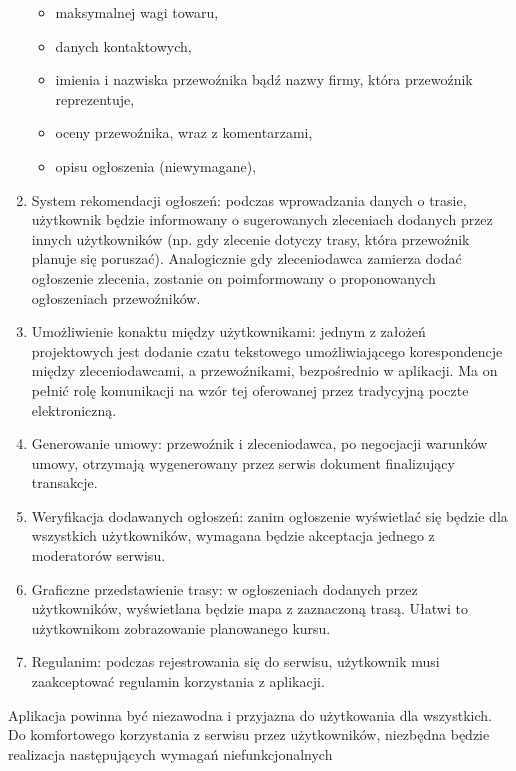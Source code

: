 \begin{enumerate}
\begin{itemize}
        \item maksymalnej wagi towaru,
        \item danych kontaktowych,
        \item imienia i nazwiska przewoźnika bądź nazwy firmy, która przewoźnik reprezentuje,
        \item oceny przewoźnika, wraz z komentarzami,
        \item opisu ogłoszenia (niewymagane),
    \end{itemize}
    \item System rekomendacji ogłoszeń: podczas wprowadzania danych o trasie, użytkownik będzie informowany o sugerowanych zleceniach dodanych przez innych użytkowników (np. gdy zlecenie dotyczy trasy, która przewoźnik planuje się poruszać). Analogicznie gdy zleceniodawca zamierza dodać ogłoszenie zlecenia, zostanie on poimformowany o proponowanych ogłoszeniach przewoźników.
    \item Umożliwienie konaktu między użytkownikami: jednym z założeń projektowych jest dodanie czatu tekstowego umożliwiającego korespondencje między zleceniodawcami, a przewoźnikami, bezpośrednio w aplikacji. Ma on pełnić rolę komunikacji na wzór tej  oferowanej przez tradycyjną poczte elektroniczną.
    \item Generowanie umowy: przewoźnik i zleceniodawca, po negocjacji warunków umowy, otrzymają wygenerowany przez serwis dokument finalizujący transakcje.
    \item Weryfikacja dodawanych ogłoszeń: zanim ogłoszenie wyświetlać się będzie dla wszystkich użytkowników, wymagana będzie akceptacja jednego z moderatorów serwisu.
    \item Graficzne przedstawienie trasy: w ogłoszeniach dodanych przez użytkowników, wyświetlana będzie mapa z zaznaczoną trasą. Ułatwi to użytkownikom zobrazowanie planowanego kursu.
    \item Regulanim: podczas rejestrowania się do serwisu, użytkownik musi zaakceptować regulamin korzystania z aplikacji. 
\end{enumerate}
Aplikacja powinna być niezawodna i przyjazna do użytkowania dla wszystkich. Do komfortowego korzystania z serwisu przez użytkowników, niezbędna będzie realizacja następujących wymagań niefunkcjonalnych
